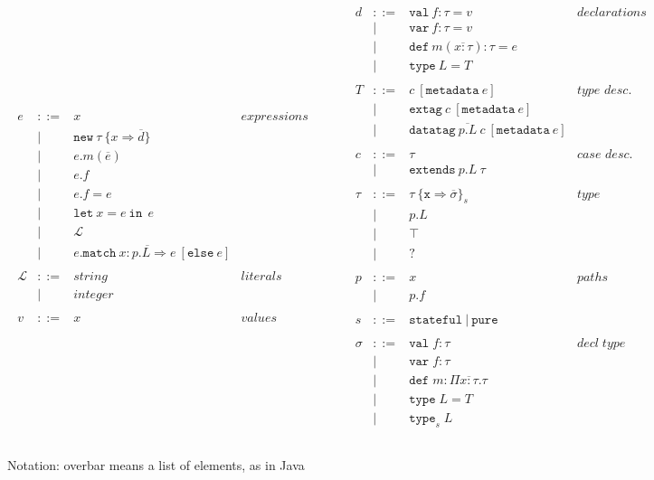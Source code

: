 \documentclass{article}
\newcommand{\keywadj}[1]{\mathtt{#1}}
\newcommand{\keyw}[1]{\keywadj{#1}~}
\begin{document}
\[\begin{array}{lll}
\begin{array}{lllr}
e & ::= & x & expressions \\
& | & \keywadj{new}~\tau~\{x \Rightarrow \overline{d}\}&\\
& | & e.m(\overline{e}) &\\
& | & e.f &\\
& | & e.f = e&\\
& | & \keyw{let} x=e~\keyw{in}~e &\\
& | & \mathscr{L} &\\
  & | & e.\keyw{match} \overline{x:p.L \Rightarrow e} ~[\keyw{else} e] &\\
&&\\
\mathscr{L} & ::= & string & literals \\
& | & integer &\\
&&\\
v & ::= & x & values \\
&&\\
\end{array}
& ~~~~~~
&
\begin{array}{lllr}
d & ::= & \keyw{val} f : \tau = v & declarations \\
  & |   & \keyw{var} f : \tau = v &\\
  & |   & \keyw{def} m(\overline{x:\tau}) : \tau = e &\\
  & |   & \keyw{type} L = T &\\
&&\\
  T & ::= & c ~[\keyw{metadata} e]& \textit{type desc.}\\
& | & \keyw{extag} c ~[\keyw{metadata} e]&\\
& | & \keyw{datatag} \overline{p.L}~c ~[\keyw{metadata} e]&\\
&&\\
c & ::= & \tau & \textit{case desc.} \\
& | & \keyw{extends} p.L~\tau &\\
&&\\
\tau & ::= & \tau~\{\texttt{x} \Rightarrow \overline{\sigma}\}_{s} & type \\
& | & p.L &\\
& | & \top &\\
& | & ? &\\
&&\\
p & ::= & x & paths \\
& | & p.f &\\
&&\\
s & ::= & \keyw{stateful} | ~\keyw{pure} \\
&&\\
\sigma & ::= & \texttt{val} \; f:\tau & decl \; type\\
       & |   & \texttt{var} \; f:\tau \\
       & |   & \texttt{def} \; m:\Pi \overline{x{:}\tau} . \tau \\
       & |   & \texttt{type} \; L = T &\\
       & |   & \texttt{type}_{s} \; L &\\
&&\\
\end{array}
\end{array}
\]

Notation: overbar means a list of elements, as in Java
\end{document}
